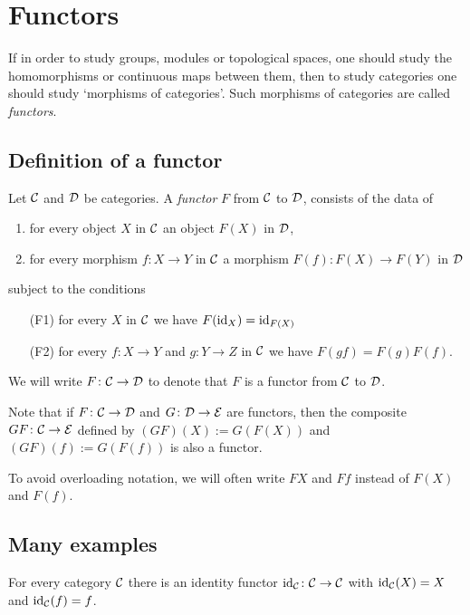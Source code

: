 
\chapter{Functors}

If in order to study groups, modules or topological spaces, one should study the homomorphisms or continuous maps between them, then to study categories one should study `morphisms of categories'. Such morphisms of categories are called \emph{functors}. 

\section{Definition of a functor}

\begin{definition} Let ${\mathcal{C}}$ and ${\mathcal{D}}$ be categories. A \emph{functor} $F$ from ${\mathcal{C}}$ to ${\mathcal{D}}$, consists of the data of
\begin{enumerate}
\item for every object $X$ in ${\mathcal{C}}$ an object $F(X)$ in ${\mathcal{D}}$,
\item for every morphism $f\colon X\to Y$ in ${\mathcal{C}}$ a morphism $F(f)\colon F(X) \to F(Y)$ in ${\mathcal{D}}$
\end{enumerate}
subject to the conditions
\begin{enumerate}
\item[(F1)] for every $X$ in ${\mathcal{C}}$ we have $F({\rm id}_X) = {\rm id}_{F(X)}$
\item[(F2)] for every $f\colon X\to Y$ and $g\colon Y\to Z$ in ${\mathcal{C}}$ we have $F(gf)=F(g)F(f)$.
\end{enumerate}
\end{definition}

We will  write $F\colon {\mathcal{C}}\to {\mathcal{D}}$ to denote that $F$ is a functor from ${\mathcal{C}}$ to ${\mathcal{D}}$.

Note that if $F\colon {\mathcal{C}}\to {\mathcal{D}}$ and $G\colon {\mathcal{D}} \to {\mathcal{E}}$ are functors, then  the composite $GF\colon {\mathcal{C}} \to {\mathcal{E}}$ defined by $(GF)(X) := G(F(X))$ and $(GF)(f) := G(F(f))$ is also a functor. 

To avoid overloading notation, we will often write $FX$ and $Ff$ instead of $F(X)$ and $F(f)$.

\section{Many examples}

\begin{example}[Identity]
For every category ${\mathcal{C}}$  there is an identity functor
${\rm id}_{\mathcal{C}} \colon {\mathcal{C}} \to {\mathcal{C}}$ with ${\rm id}_{\mathcal{C}}(X) = X$ and ${\rm id}_{\mathcal{C}}(f)= f$. 
\end{example}

